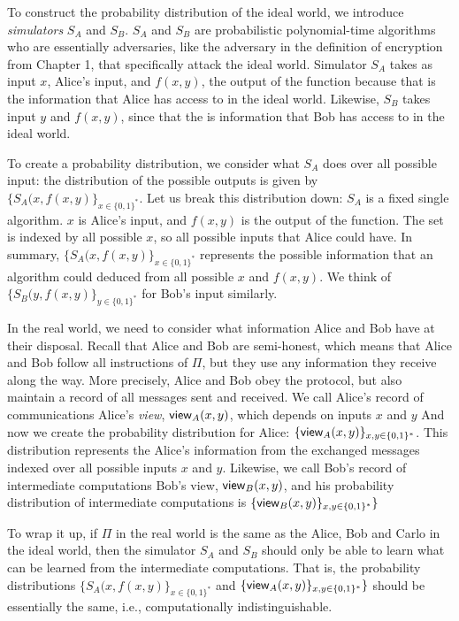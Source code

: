 To construct the probability distribution of the ideal world, we introduce \textit{simulators} $S_A$ and $S_B$.
$S_A$ and $S_B$ are probabilistic polynomial-time algorithms who are essentially adversaries, like the adversary in the definition of encryption from Chapter 1, that specifically attack the ideal world.
Simulator $S_A$ takes as input $x$, Alice's input, and $f(x,y)$, the output of the function because that is the information that Alice has access to in the ideal world.
Likewise, $S_B$ takes input $y$ and $f(x,y)$, since that the is information that Bob has access to in the ideal world.

To create a probability distribution, we consider what $S_A$ does over all possible input: the distribution of the possible outputs is given by $\{S_A(x, f(x,y)\}_{x \in \{0,1\}^*}$.
Let us break this distribution down: $S_A$ is a fixed single algorithm.
$x$ is Alice's input, and $f(x,y)$ is the output of the function.
The set is indexed by all possible $x$, so all possible inputs that Alice could have.
In summary, $\{S_A(x, f(x,y)\}_{x \in \{0,1\}^*}$ represents the possible information that an algorithm could deduced from all possible $x$ and $f(x,y)$.
We think of $\{S_B(y, f(x,y)\}_{y \in \{0,1\}^*}$ for Bob's input similarly.

In the real world, we need to consider what information Alice and Bob have at their disposal.
Recall that Alice and Bob are semi-honest, which means that Alice and Bob follow all instructions of $\Pi$, but they use any information they receive along the way.
More precisely, Alice and Bob obey the protocol, but also maintain a record of all messages sent and received.
We call Alice's record of communications Alice's \textit{view}, ${\sf view}_A(x, y)$, which depends on inputs $x$ and $y$
And now we create the probability distribution for Alice: $\{{\sf view}_A(x, y)\}_{x, y \in \{0,1\}^*}$.
This distribution represents the Alice's information from the exchanged messages indexed over all possible inputs $x$ and $y$.
Likewise, we call Bob's record of intermediate computations Bob's view,  ${\sf view}_B(x, y)$, and his probability distribution of intermediate computations is $\{{\sf view}_B(x, y)\}_{x,y \in \{0,1\}^*}\}$

To wrap it up, if $\Pi$ in the real world is the same as the Alice, Bob and Carlo in the ideal world, then the simulator $S_A$ and $S_B$ should only be able to learn what can be learned from the intermediate computations. 
That is, the probability distributions $\{S_A(x, f(x,y)\}_{x \in \{0,1\}^*}$ and $\{{\sf view}_A(x, y)\}_{x, y \in \{0,1\}^*}\}$ should be essentially the same, i.e., computationally indistinguishable.

